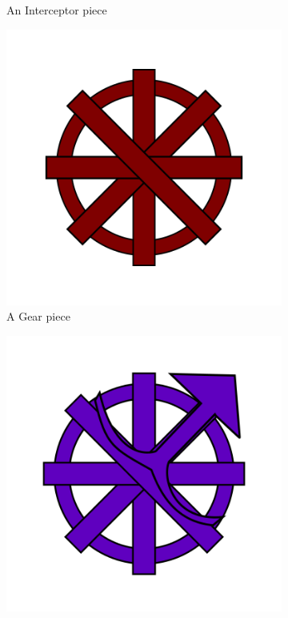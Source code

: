 \documentclass{l4proj}
\begin{document}
\begin{figure}
\begin{subfigure}[b]{0.20\textwidth}
        \caption{An Interceptor piece \\}
        \label{fig:interceptor}
    \end{subfigure}
    \begin{subfigure}[b]{0.20\textwidth}
        \includegraphics[width=\textwidth]{images/gear.png}
        \caption{A Gear piece \\}
        \label{fig:gear}
    \end{subfigure}
    \begin{subfigure}[b]{0.20\textwidth}
        \includegraphics[width=\textwidth]{images/gear-bit.png}

\end{subfigure}
\end{figure}
\end{document}
